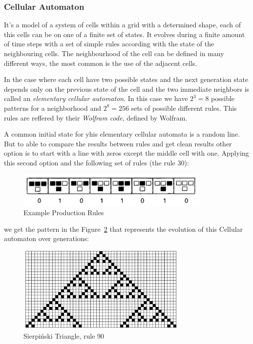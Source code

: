 
\subsubsection{Cellular Automaton} %
\label{ssub:cellular_automaton}

It's a model of a system of cells within a grid with a determined shape, each of this cells can be on one of a finite set of states. It evolves during a finite amount of time steps with a set of simple rules according with the state of the neighbouring cells.
The neighbourhood of the cell can be defined in many different ways, the most common is the use of the adjacent cells. 

In the case where each cell have two possible states and the next generation state depends only on the previous state of the cell and the two immediate neighbors is called an \emph{elementary cellular automaton}. In this case we have $2^3 = 8$ possible patterns for a neighborhood and $2^8 = 256$ sets of possible different rules. This rules are reffered by their \emph{Wolfram code}, defined by Wolfram. 

A common initial state for yhis elementary cellular automata is a random line. But to able to compare the results between rules and get clean results other option is to start with a line with zeros except the middle cell with one. Applying this second option and the following set of rules (the rule 30):

\begin{figure}[htbp]
	\centering
	\includegraphics[width=0.85\textwidth]{img/Theory/Cellular_A/Rules.png}
	\caption{Example Production Rules\cite{Shiffman2012}}
	\label{fig:label}
\end{figure}

we get the pattern in the Figure~\ref{fig:resultCA} that represents the evolution of this Cellular automaton over generations:

\begin{figure}[H]
    \centering
    \includegraphics[width=0.75\textwidth]{img/Theory/Cellular_A/Result.png}
    \caption{Sierpiński Triangle, rule 90}
    \label{fig:resultCA}
\end{figure}


